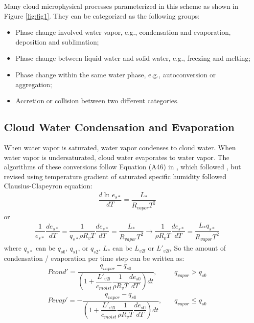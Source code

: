 \documentclass[letterpaper,titlepage,10pt]{article}
\numberwithin{equation}{section}
\begin{document}
Many cloud microphysical processes parameterized in this scheme as shown in Figure \ref{fig:fig1}. They can be categorized as the following groups:
\begin{itemize}
	\setlength\itemsep{0em}
	\item Phase change involved water vapor, e.g., condensation and evaporation, deposition and sublimation;
	\item Phase change between liquid water and solid water, e.g., freezing and melting;
	\item Phase change within the same water phase, e.g., autoconversion or aggregation;
	\item Accretion or collision between two different categories.
\end{itemize}


\subsection{Cloud Water Condensation and Evaporation}

When water vapor is saturated, water vapor condenses to cloud water. When water vapor is undersaturated, cloud water evaporates to water vapor. The algorithms of these conversions follow Equation (A46) in \citet{hong2006thew}, which followed \citet{yau1979amod}, but revised using temperature gradient of saturated specific humidity followed Clausius-Clapeyron equation:
\begin{gather}
	\dfrac{d \ln e_{s*}}{d T} = \dfrac{L_*}{R_{vapor} T^2}
\end{gather}
or
\begin{gather}
	\dfrac{1}{e_{s*}} \dfrac{d e_{s*}}{d T} = \dfrac{1}{q_{s*} \rho R_v T} \dfrac{d e_{s*}}{d T} = \dfrac{L_* }{R_{vapor} T^2} \rightarrow \dfrac{1}{\rho R_v T} \dfrac{d e_{s*}}{d T} = \dfrac{L_* q_{s*}}{R_{vapor} T^2}
\end{gather}
where $q_{s*}$ can be $q_{s0}$, $q_{s1}$, or $q_{s2}$. $L_*$ can be $L_{v2l}$ or $L'_{v2l}$, So the amount of condensation / evaporation per time step can be written as:
\begin{align}
	Pcond' = \dfrac{q_{vapor} - q_{s0}}{\left(1 + \dfrac{L'_{v2l}}{c_{moist}} \dfrac{1}{\rho R_v T} \dfrac{de_{s0}}{dT} \right) dt}, & \quad q_{vapor} > q_{s0} \\
	Pevap' = - \dfrac{q_{vapor} - q_{s0}}{\left(1 + \dfrac{L'_{v2l}}{c_{moist}} \dfrac{1}{\rho R_v T} \dfrac{de_{s0}}{dT} \right) dt}, & \quad q_{vapor} \leq q_{s0}
\end{align}
\end{document}
